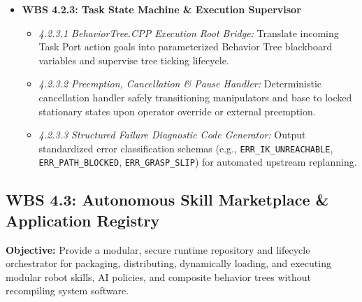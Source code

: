 \documentclass[10pt,a4paper]{article}
\begin{document}
\begin{itemize}[leftmargin=1.5em]
    \item \textbf{WBS 4.2.3: Task State Machine \& Execution Supervisor}
    \begin{itemize}[leftmargin=1.2em]
        \item \emph{4.2.3.1 BehaviorTree.CPP Execution Root Bridge:} Translate incoming Task Port action goals into parameterized Behavior Tree blackboard variables and supervise tree ticking lifecycle.
        \item \emph{4.2.3.2 Preemption, Cancellation \& Pause Handler:} Deterministic cancellation handler safely transitioning manipulators and base to locked stationary states upon operator override or external preemption.
        \item \emph{4.2.3.3 Structured Failure Diagnostic Code Generator:} Output standardized error classification schemas (e.g., \texttt{ERR\_IK\_UNREACHABLE}, \texttt{ERR\_PATH\_BLOCKED}, \texttt{ERR\_GRASP\_SLIP}) for automated upstream replanning.
    \end{itemize}
\end{itemize}

\subsection{WBS 4.3: Autonomous Skill Marketplace \& Application Registry}
\textbf{Objective:} Provide a modular, secure runtime repository and lifecycle orchestrator for packaging, distributing, dynamically loading, and executing modular robot skills, AI policies, and composite behavior trees without recompiling system software.
\end{document}
